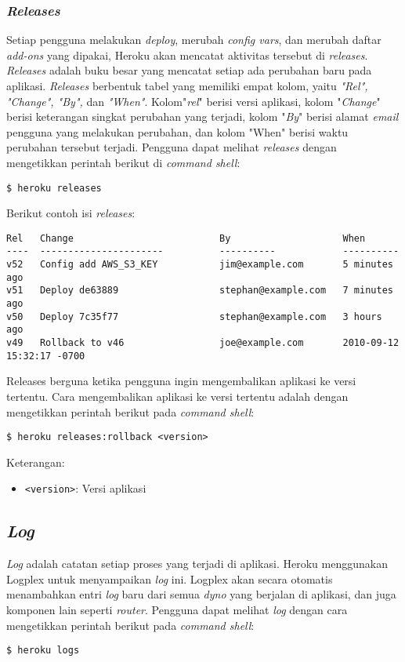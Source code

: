 \subsubsection{\textit{Releases}}
Setiap pengguna melakukan \textit{deploy}, merubah \textit{config vars}, dan merubah daftar \textit{add-ons} yang dipakai, Heroku akan mencatat aktivitas tersebut di \textit{releases}. \textit{Releases} adalah buku besar yang mencatat setiap ada perubahan baru pada aplikasi. \textit{Releases} berbentuk tabel yang memiliki empat kolom, yaitu \textit{"Rel", "Change", "By",} dan \textit{"When"}. Kolom"\textit{rel}" berisi versi aplikasi, kolom "\textit{Change}" berisi keterangan singkat perubahan yang terjadi, kolom "\textit{By}" berisi alamat \textit{email} pengguna yang melakukan perubahan, dan kolom "When" berisi waktu perubahan tersebut terjadi. Pengguna dapat melihat \textit{releases} dengan mengetikkan perintah berikut di \textit{command shell}:
\begin{lstlisting}
$ heroku releases
\end{lstlisting}

Berikut contoh isi \textit{releases}:
\begin{lstlisting}
Rel   Change                          By                    When
----  ----------------------          ----------            ----------
v52   Config add AWS_S3_KEY           jim@example.com       5 minutes ago
v51   Deploy de63889                  stephan@example.com   7 minutes ago
v50   Deploy 7c35f77                  stephan@example.com   3 hours ago
v49   Rollback to v46                 joe@example.com       2010-09-12 15:32:17 -0700
\end{lstlisting}

Releases berguna ketika pengguna ingin mengembalikan aplikasi ke versi tertentu. Cara mengembalikan aplikasi ke versi tertentu adalah dengan mengetikkan perintah berikut pada \textit{command shell}:
\begin{lstlisting}
$ heroku releases:rollback <version>
\end{lstlisting}
Keterangan:
\begin{itemize}
\item \texttt{<version>}: Versi aplikasi
\end{itemize}

\subsection{\textit{Log}}
\textit{Log} adalah catatan setiap proses yang terjadi di aplikasi. Heroku menggunakan Logplex untuk menyampaikan \textit{log} ini. Logplex akan secara otomatis menambahkan entri \textit{log} baru dari semua \textit{dyno} yang berjalan di aplikasi, dan juga komponen lain seperti \textit{router}. Pengguna dapat melihat \textit{log} dengan cara mengetikkan perintah berikut pada \textit{command shell}:
\begin{lstlisting}
$ heroku logs
\end{lstlisting}

